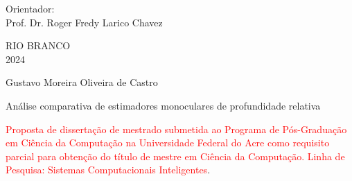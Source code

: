 	\vskip1.50cm
	  \begin{center}
	    \small Orientador: \\
	    Prof. Dr. {Roger Fredy Larico Chavez}\vskip3.5cm 
	  \end{center}
	  \begin{center}
	    \vspace{4mm}
	    RIO BRANCO \\
	    2024
	  \end{center}
	
	\thispagestyle{empty}
	\cleardoublepage
	\thispagestyle{empty}
	
	\vspace{-60mm}
	
	\begin{center}
	  {\large Gustavo Moreira Oliveira de Castro} \\
	  \vspace{7mm}
	
	  {\large Análise comparativa de estimadores monoculares de profundidade relativa} \\
	  \vspace{10mm}
	\end{center}
	
	\noindent
	\begin{flushright}
	  \begin{minipage}[t]{8cm}
	
		\textcolor{red}{Proposta de dissertação de mestrado submetida ao Programa de Pós-Graduação em Ciência da Computação na Universidade Federal do Acre como requisito parcial para obtenção do título de mestre em Ciência da Computação. Linha de Pesquisa: Sistemas Computacionais Inteligentes}.
	
	  \end{minipage}
	\end{flushright}
	
	\vspace{1.0 cm}
	\noindent
	
